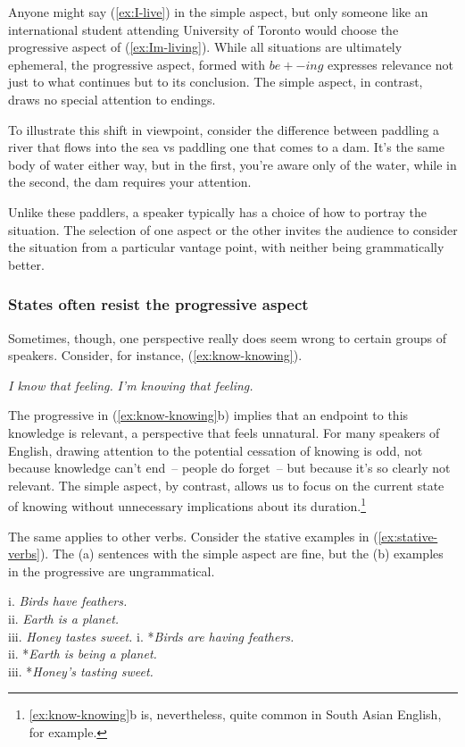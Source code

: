 Anyone might say (\ref{ex:I-live}) in the simple aspect, but only someone like an international student attending University of Toronto would choose the progressive aspect of (\ref{ex:Im-living}). While all situations are ultimately ephemeral, the progressive aspect, formed with $be+-ing$ expresses relevance not just to what continues but to its conclusion. The simple aspect, in contrast, draws no special attention to endings.

To illustrate this shift in viewpoint, consider the difference between paddling a river that flows into the sea vs paddling one that comes to a dam. It's the same body of water either way, but in the first, you're aware only of the water, while in the second, the dam requires your attention.

Unlike these paddlers, a speaker typically has a choice of how to portray the situation. The selection of one aspect or the other invites the audience to consider the situation from a particular vantage point, with neither being grammatically better.

\subsubsection{States often resist the progressive aspect}\label{sec:statives-resist}
Sometimes, though, one perspective really does seem wrong to certain groups of speakers. Consider, for instance, (\ref{ex:know-knowing}).

\ea \label{ex:know-knowing}
\ea \textit{I know that feeling.}
\ex *\textit{I'm knowing that feeling.}
\z\z

The progressive in (\ref{ex:know-knowing}b) implies that an endpoint to this knowledge is relevant, a perspective that feels unnatural. For many speakers of English, drawing attention to the potential cessation of knowing is odd, not because knowledge can't end~-- people do forget~-- but because it's so clearly not relevant. The simple aspect, by contrast, allows us to focus on the current state of knowing without unnecessary implications about its duration.\footnote{\ref{ex:know-knowing}b is, nevertheless, quite common in South Asian English, for example.}

The same applies to other verbs. Consider the stative examples in (\ref{ex:stative-verbs}). The (a) sentences with the simple aspect are fine, but the (b) examples in the progressive are ungrammatical.

\ea\label{ex:stative-verbs}
\ea \textnormal{i.} \textit{Birds have feathers.} \\ \textnormal{ii.} \textit{Earth is a planet.} \\ \textnormal{iii.} \textit{Honey tastes sweet.}
\ex \textnormal{i.} *\textit{Birds are having feathers.} \\ \textnormal{ii.} *\textit{Earth is being a planet.} \\ \textnormal{iii.} *\textit{Honey's tasting sweet.}
\z\z

